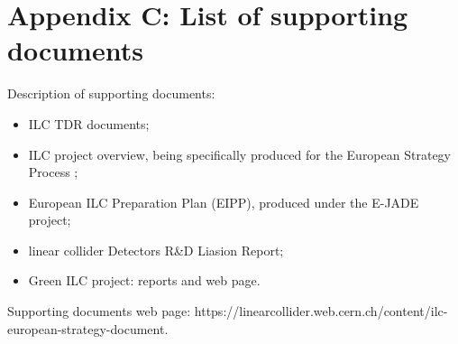 \documentclass[%
 reprint,
 amsmath,amssymb,
 aps,
]{revtex4-1}
\begin{document}
\newpage

\section*{\label{Appendix3} \Large{Appendix C: List of supporting documents} }
Description of supporting documents:
\begin{itemize}
\item
ILC TDR documents;
\item
ILC project overview, being specifically produced for the European Strategy Process \cite{ILCforESS};
\item
European ILC Preparation Plan (EIPP), produced under the E-JADE project;
\item
linear collider Detectors R\&D Liasion Report;
\item
Green ILC project: reports and web page.

\end{itemize}

Supporting documents web page: https://linearcollider.web.cern.ch/content/ilc-european-strategy-document.
\end{document}
